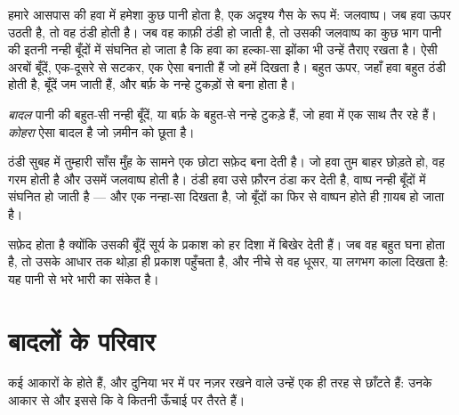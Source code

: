 हमारे आसपास की हवा में हमेशा कुछ पानी होता है, एक अदृश्य गैस के रूप में:
जलवाष्प। जब हवा ऊपर उठती है, तो वह ठंडी होती है। जब वह काफ़ी ठंडी हो जाती है,
तो उसकी जलवाष्प का कुछ भाग पानी की इतनी नन्ही बूँदों में संघनित हो जाता है कि
हवा का हल्का-सा झोंका भी उन्हें तैराए रखता है। ऐसी अरबों बूँदें, एक-दूसरे से
सटकर, एक ऐसा  बनाती हैं जो हमें दिखता है। बहुत ऊपर, जहाँ हवा बहुत ठंडी
होती है, बूँदें जम जाती हैं, और  बर्फ़ के नन्हे टुकड़ों से बना होता है।

\begin{definition}[बादल और कोहरा]\label{def:g4:clouds-rain-snow:cloud}
\emph{बादल} पानी की बहुत-सी नन्ही बूँदें, या बर्फ़ के बहुत-से नन्हे
टुकड़े हैं, जो हवा में एक साथ तैर रहे हैं। \emph{कोहरा} ऐसा बादल
है जो ज़मीन को छूता है।
\end{definition}

\begin{example}[ठंडी सुबह में तुम्हारी साँस]\label{ex:g4:clouds-rain-snow:breath}
ठंडी सुबह में तुम्हारी साँस मुँह के सामने एक छोटा सफ़ेद  बना देती है।
जो हवा तुम बाहर छोड़ते हो, वह गरम होती है और उसमें जलवाष्प होती है। ठंडी हवा
उसे फ़ौरन ठंडा कर देती है, वाष्प नन्ही बूँदों में संघनित हो जाती है --- और एक
नन्हा-सा  दिखता है, जो बूँदों का फिर से वाष्पन होते ही ग़ायब हो जाता है।
\end{example}

 सफ़ेद होता है क्योंकि उसकी बूँदें सूर्य के प्रकाश को हर दिशा में बिखेर
देती हैं। जब वह बहुत घना होता है, तो उसके आधार तक थोड़ा ही प्रकाश पहुँचता है,
और नीचे से वह धूसर, या लगभग काला दिखता है: यह पानी से भरे भारी  का
संकेत है।

\section{बादलों के परिवार}

 कई आकारों के होते हैं, और दुनिया भर में  पर नज़र रखने वाले उन्हें
एक ही तरह से छाँटते हैं: उनके आकार से और इससे कि वे कितनी ऊँचाई पर तैरते हैं।

